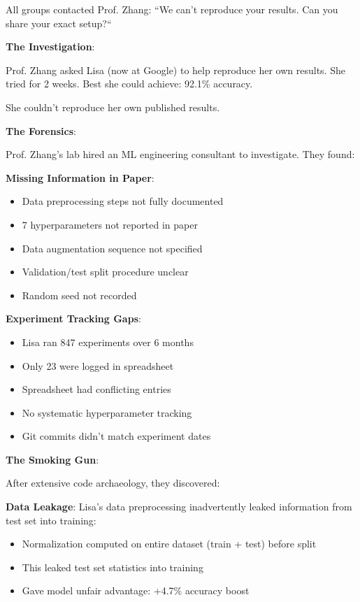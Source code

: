 All groups contacted Prof. Zhang: ``We can't reproduce your results. Can you share your exact setup?``

\textbf{The Investigation}:

Prof. Zhang asked Lisa (now at Google) to help reproduce her own results. She tried for 2 weeks. Best she could achieve: 92.1\% accuracy.

She couldn't reproduce her own published results.

\textbf{The Forensics}:

Prof. Zhang's lab hired an ML engineering consultant to investigate. They found:

\textbf{Missing Information in Paper}:
\begin{itemize}
    \item Data preprocessing steps not fully documented
    \item 7 hyperparameters not reported in paper
    \item Data augmentation sequence not specified
    \item Validation/test split procedure unclear
    \item Random seed not recorded
\end{itemize}

\textbf{Experiment Tracking Gaps}:
\begin{itemize}
    \item Lisa ran 847 experiments over 6 months
    \item Only 23 were logged in spreadsheet
    \item Spreadsheet had conflicting entries
    \item No systematic hyperparameter tracking
    \item Git commits didn't match experiment dates
\end{itemize}

\textbf{The Smoking Gun}:

After extensive code archaeology, they discovered:

\textbf{Data Leakage}: Lisa's data preprocessing inadvertently leaked information from test set into training:
\begin{itemize}
    \item Normalization computed on entire dataset (train + test) before split
    \item This leaked test set statistics into training
    \item Gave model unfair advantage: +4.7\% accuracy boost
\end{itemize}


